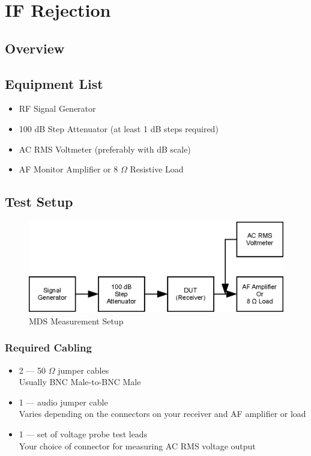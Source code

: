 \documentclass[10pt,letterpaper]{book}
\begin{document}
\section{IF Rejection}

\subsection*{Overview}
\subsection*{Equipment List}
\begin{itemize}
	\item RF Signal Generator
	\item 100 dB Step Attenuator (at least 1 dB steps required)
	\item AC RMS Voltmeter (preferably with dB scale)
	\item AF Monitor Amplifier or 8 $\Omega$ Resistive Load
\end{itemize}
\subsection*{Test Setup}
\begin{figure}
\centering
\includegraphics[scale=1]{Illustrations/MDSSetup}
\caption{MDS Measurement Setup}
\end{figure}
\subsubsection*{Required Cabling}
\begin{itemize}
	\item 2 --- 50 $\Omega$ jumper cables \\
		Usually BNC Male-to-BNC Male
	\item 1 --- audio jumper cable \\
		Varies depending on the connectors on your receiver and AF amplifier or load
	\item 1 --- set of voltage probe test leads \\
		Your choice of connector for measuring AC RMS voltage output
\end{itemize}
\end{document}
